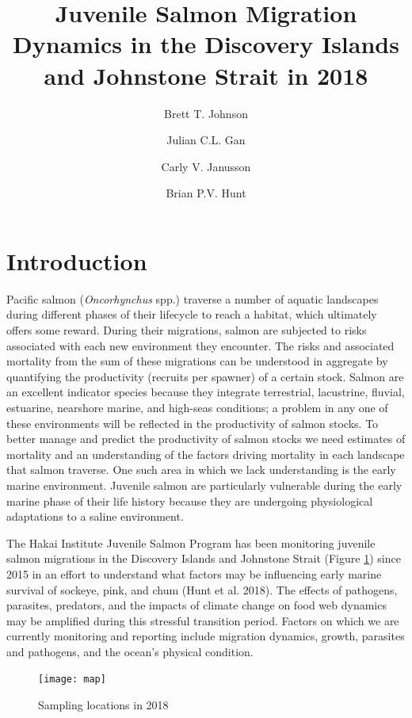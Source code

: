 \documentclass[fleqn,10pt]{wlpeerj} %
\title{Juvenile Salmon Migration Dynamics in the Discovery Islands and
Johnstone Strait in 2018}
\author[1]{Brett T. Johnson}
\author[]{Julian C.L. Gan}
\author[]{Carly V. Janusson}
\author[2, 3]{Brian P.V. Hunt}
\affil[1]{Hakai Institute Quadra Island Ecological Observatory, Heriot Bay, BC
V0P1H0}
\affil[2]{UBC EOS, IOF}
\begin{document}
\flushbottom
\maketitle
\thispagestyle{empty}

\section*{Introduction}\label{introduction}

Pacific salmon (\emph{Oncorhynchus} spp.) traverse a number of aquatic
landscapes during different phases of their lifecycle to reach a
habitat, which ultimately offers some reward. During their migrations,
salmon are subjected to risks associated with each new environment they
encounter. The risks and associated mortality from the sum of these
migrations can be understood in aggregate by quantifying the
productivity (recruits per spawner) of a certain stock. Salmon are an
excellent indicator species because they integrate terrestrial,
lacustrine, fluvial, estuarine, nearshore marine, and high-seas
conditions; a problem in any one of these environments will be reflected
in the productivity of salmon stocks. To better manage and predict the
productivity of salmon stocks we need estimates of mortality and an
understanding of the factors driving mortality in each landscape that
salmon traverse. One such area in which we lack understanding is the
early marine environment. Juvenile salmon are particularly vulnerable
during the early marine phase of their life history because they are
undergoing physiological adaptations to a saline environment.

The Hakai Institute Juvenile Salmon Program has been monitoring juvenile
salmon migrations in the Discovery Islands and Johnstone Strait (Figure
\ref{fig:map}) since 2015 in an effort to understand what factors may be
influencing early marine survival of sockeye, pink, and chum (Hunt et
al. 2018). The effects of pathogens, parasites, predators, and the
impacts of climate change on food web dynamics may be amplified during
this stressful transition period. Factors on which we are currently
monitoring and reporting include migration dynamics, growth, parasites
and pathogens, and the ocean's physical condition.

\begin{figure}

\texttt{[image: map]} \hfill{}

\caption{Sampling locations in 2018}\label{fig:map}
\end{figure}
\end{document}
